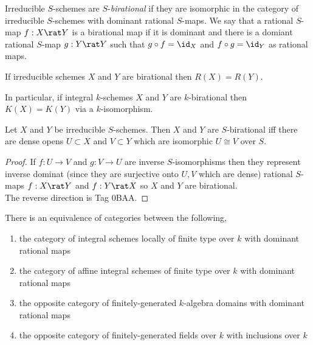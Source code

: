 \documentclass[12pt]{article}
\begin{document}
\begin{definition}
Irreducible $S$-schemes are $S$-\textit{birational} if they are isomorphic in the category of irreducible $S$-schemes with dominant rational $S$-maps. We say that a rational $S$-map $f : X \rat Y$ is a birational map if it is dominant and there is a domiant rational $S$-map $g : Y \rat Y$ such that $g \circ f = \id_X$ and $f \circ g = \id_Y$ as rational maps. 
\end{definition}

\begin{prop}
If irreducible schemes $X$ and $Y$ are birational then $R(X) = R(Y)$. 
\end{prop}

\begin{prop}
In particular, if integral $k$-schemes $X$ and $Y$ are $k$-birational then $K(X) = K(Y)$ via a $k$-isomorphism. 
\end{prop}

\begin{prop}
Let $X$ and $Y$ be irreducible $S$-schemes. Then $X$ and $Y$ are $S$-birational iff there are dense opens $U \subset X$ and $V \subset Y$ which are isomorphic $U \cong V$ over $S$.
\end{prop}

\begin{proof}
If $f : U \to V$ and $g : V \to U$ are inverse $S$-isomorphisms then they represent inverse dominat (since they are surjective onto $U,V$ which are dense) rational $S$-maps $f : X \rat Y$ and $f : Y \rat X$ so $X$ and $Y$ are birational.
\bigskip\\
The reverse direction is Tag 0BAA.
\end{proof}

\begin{theorem}
There is an equivalence of categories between the following,
\begin{enumerate}
\item the category of integral schemes locally of finite type over $k$ with dominant rational maps
\item the category of affine integral schemes of finite type over $k$ with dominant rational maps
\item the opposite category of finitely-generated $k$-algebra domains with dominant rational maps
\item the opposite category of finitely-generated fields over $k$ with inclusions over $k$
\end{enumerate}
\end{theorem}
\end{document}
